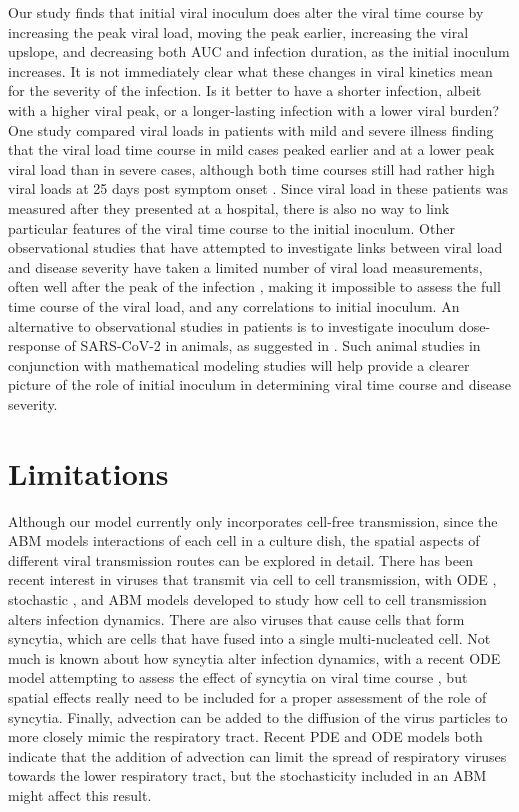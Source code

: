 Our study finds that initial viral inoculum does alter the viral time course by increasing the peak viral load, moving the peak earlier, increasing the viral upslope, and decreasing both AUC and infection duration, as the initial inoculum increases. It is not immediately clear what these changes in viral kinetics mean for the severity of the infection. Is it better to have a shorter infection, albeit with a higher viral peak, or a longer-lasting infection with a lower viral burden? One study compared viral loads in patients with mild and severe illness finding that the viral load time course in mild cases peaked earlier and at a lower peak viral load than in severe cases, although both time courses still had rather high viral loads at 25 days post symptom onset \cite{zheng20}. Since viral load in these patients was measured after they presented at a hospital, there is also no way to link particular features of the viral time course to the initial inoculum. Other observational studies that have attempted to investigate links between viral load and disease severity have taken a limited number of viral load measurements, often well after the peak of the infection \cite{liu20, liu20imm,to20}, making it impossible to assess the full time course of the viral load, and any correlations to initial inoculum. An alternative to observational studies in patients is to investigate inoculum dose-response of SARS-CoV-2 in animals, as suggested in \cite{little20}. Such animal studies in conjunction with mathematical modeling studies will help provide a clearer picture of the role of initial inoculum in determining viral time course and disease severity.

\section{Limitations}

Although our model currently only incorporates cell-free transmission, since the ABM models interactions of each cell in a culture dish, the spatial aspects of different viral transmission routes can be explored in detail. There has been recent interest in viruses that transmit via cell to cell transmission, with ODE \cite{allen15,komarova13,iwami15}, stochastic \cite{graw15}, and ABM \cite{kumberger18,blahut21} models developed to study how cell to cell transmission alters infection dynamics. There are also viruses that cause cells that form syncytia, which are cells that have fused into a single multi-nucleated cell. Not much is known about how syncytia alter infection dynamics, with a recent ODE model attempting to assess the effect of syncytia on viral time course \cite{jessie21}, but spatial effects really need to be included for a proper assessment of the role of syncytia. Finally, advection can be added to the diffusion of the virus particles to more closely mimic the respiratory tract. Recent PDE \cite{quirouette20} and ODE \cite{gonzalez19} models both indicate that the addition of advection can limit the spread of respiratory viruses towards the lower respiratory tract, but the stochasticity included in an ABM might affect this result. 

